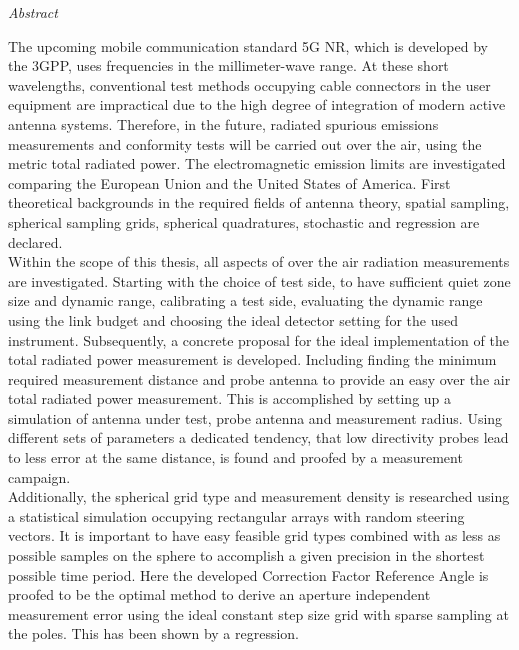 

\newpage
\thispagestyle{empty}
\begin{center}
\Huge\emph{Abstract}
\end{center}
\medskip
\noindent

The upcoming mobile communication standard 5G NR, which is developed by the 3GPP, uses frequencies in the millimeter-wave range.
At these short wavelengths, conventional test methods occupying cable connectors in the user equipment are impractical due to the high degree of integration of modern active antenna systems.
Therefore, in the future, radiated spurious emissions measurements and conformity tests will be carried out over the air, using the metric total radiated power.
The electromagnetic emission limits are investigated comparing the European Union and the United States of America.
First theoretical backgrounds in the required fields of antenna theory, spatial sampling, spherical sampling grids, spherical quadratures, stochastic and regression are declared.\\

Within the scope of this thesis, all aspects of over the air radiation measurements are investigated.
Starting with the choice of test side, to have sufficient quiet zone size and dynamic range, calibrating a test side, evaluating the dynamic range using the link budget and choosing the ideal detector setting for the used instrument.
Subsequently, a concrete proposal for the ideal implementation of the total radiated power measurement is developed.
Including finding the minimum required measurement distance and probe antenna to provide an easy over the air total radiated power measurement.
This is accomplished by setting up a simulation of antenna under test, probe antenna and measurement radius.
Using different sets of parameters a dedicated tendency, that low directivity probes lead to less error at the same distance, is found and proofed by a measurement campaign.\\

Additionally, the spherical grid type and measurement density is researched using a statistical simulation occupying rectangular arrays with random steering vectors.
It is important to have easy feasible grid types combined with as less as possible samples on the sphere to accomplish a given precision in the shortest possible time period.
Here the developed Correction Factor Reference Angle is proofed to be the optimal method to derive an aperture independent measurement error using the ideal constant step size grid with sparse sampling at the poles.
This has been shown by a regression.

